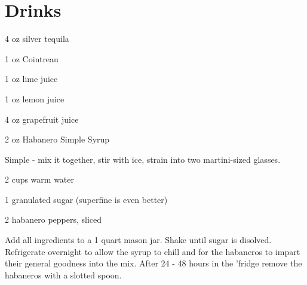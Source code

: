 \chapter{Drinks}


%
%
%
%
\newpage



\begin{IngredientsAndSteps}
      \ListIngredientsAndSteps
      {
            4 oz silver tequila

            1 oz Cointreau

            1 oz lime juice

            1 oz lemon juice

            4 oz grapefruit juice

            2 oz Habanero Simple Syrup
      }
      {
            Simple - mix it together, stir with ice, strain into two martini-sized glasses.
      }
\end{IngredientsAndSteps}

%
%
%
%
\newpage



\begin{IngredientsAndSteps}
      \ListIngredientsAndSteps
      {
            2 cups warm water

            1 granulated sugar (superfine is even better)

            2 habanero peppers, sliced
      }
      {
            Add all ingredients to a 1 quart mason jar. Shake until sugar is disolved. Refrigerate
            overnight to allow the syrup to chill and for the habaneros to impart their general
            goodness into the mix. After 24 - 48 hours in the 'fridge remove the habaneros with a
            slotted spoon.
      }
\end{IngredientsAndSteps}

